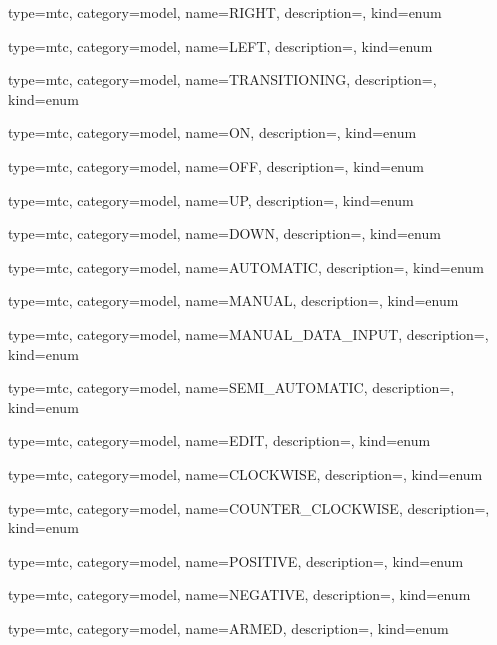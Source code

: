 {
  type=mtc,
  category=model,
  name={RIGHT},
  description={},
  kind={enum}
}


{
  type=mtc,
  category=model,
  name={LEFT},
  description={},
  kind={enum}
}


{
  type=mtc,
  category=model,
  name={TRANSITIONING},
  description={},
  kind={enum}
}


{
  type=mtc,
  category=model,
  name={ON},
  description={},
  kind={enum}
}


{
  type=mtc,
  category=model,
  name={OFF},
  description={},
  kind={enum}
}


{
  type=mtc,
  category=model,
  name={UP},
  description={},
  kind={enum}
}


{
  type=mtc,
  category=model,
  name={DOWN},
  description={},
  kind={enum}
}


{
  type=mtc,
  category=model,
  name={AUTOMATIC},
  description={},
  kind={enum}
}


{
  type=mtc,
  category=model,
  name={MANUAL},
  description={},
  kind={enum}
}


{
  type=mtc,
  category=model,
  name={MANUAL\_DATA\_INPUT},
  description={},
  kind={enum}
}


{
  type=mtc,
  category=model,
  name={SEMI\_AUTOMATIC},
  description={},
  kind={enum}
}


{
  type=mtc,
  category=model,
  name={EDIT},
  description={},
  kind={enum}
}


{
  type=mtc,
  category=model,
  name={CLOCKWISE},
  description={},
  kind={enum}
}


{
  type=mtc,
  category=model,
  name={COUNTER\_CLOCKWISE},
  description={},
  kind={enum}
}


{
  type=mtc,
  category=model,
  name={POSITIVE},
  description={},
  kind={enum}
}


{
  type=mtc,
  category=model,
  name={NEGATIVE},
  description={},
  kind={enum}
}


{
  type=mtc,
  category=model,
  name={ARMED},
  description={},
  kind={enum}
}



